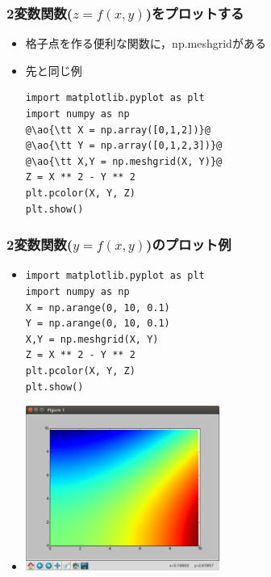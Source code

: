 \documentclass[10pt,dvipdfmx]{beamer}
\newcommand{\ao}[1]{{\color{blue}#1}}
\begin{document}
\begin{frame}[fragile]
\frametitle{2変数関数($z = f(x, y)$)をプロットする}
\begin{itemize}
\item 格子点を作る便利な関数に，np.meshgridがある
\item 先と同じ例
\begin{lstlisting}
import matplotlib.pyplot as plt
import numpy as np 
@\ao{\tt X = np.array([0,1,2])}@
@\ao{\tt Y = np.array([0,1,2,3])}@
@\ao{\tt X,Y = np.meshgrid(X, Y)}@
Z = X ** 2 - Y ** 2
plt.pcolor(X, Y, Z)
plt.show()
\end{lstlisting}
\end{itemize}
\end{frame}


\begin{frame}[fragile]
\frametitle{2変数関数($y = f(x, y)$)のプロット例}
\begin{itemize}
\item []
\begin{lstlisting}[basicstyle=\ttfamily\scriptsize]
import matplotlib.pyplot as plt
import numpy as np
X = np.arange(0, 10, 0.1)
Y = np.arange(0, 10, 0.1)
X,Y = np.meshgrid(X, Y)
Z = X ** 2 - Y ** 2
plt.pcolor(X, Y, Z)
plt.show()
\end{lstlisting}

\item []
\begin{center}
\includegraphics[width=0.5\textwidth]{out/pdf/img/pcolor.pdf}
\end{center}
\end{itemize}
\end{frame}
\end{document}
